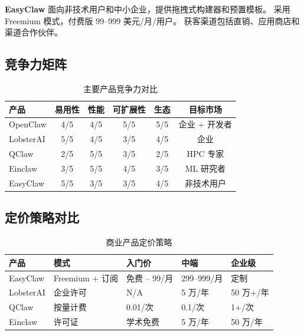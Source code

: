 \documentclass[
  customlatinfont = macos,
]{hkustthesis}
\begin{document}
\textbf{EasyClaw} 面向非技术用户和中小企业，提供拖拽式构建器和预置模板。
采用 Freemium 模式，付费版 99--999 美元/月/用户。
获客渠道包括直销、应用商店和渠道合作伙伴。

\subsection{竞争力矩阵}

\begin{table}[htbp]
\centering
\caption{主要产品竞争力对比}
\label{tab:competition}
\begin{tabular}{@{}lccccc@{}}
\toprule
\textbf{产品} & \textbf{易用性} & \textbf{性能} & \textbf{可扩展性}
              & \textbf{生态} & \textbf{目标市场} \\
\midrule
OpenClaw  & 4/5 & 4/5 & 5/5 & 5/5 & 企业 + 开发者 \\
LobsterAI & 5/5 & 4/5 & 3/5 & 4/5 & 企业          \\
QClaw     & 2/5 & 5/5 & 3/5 & 2/5 & HPC 专家      \\
Einclaw   & 3/5 & 5/5 & 4/5 & 3/5 & ML 研究者     \\
EasyClaw  & 5/5 & 3/5 & 3/5 & 4/5 & 非技术用户    \\
\bottomrule
\end{tabular}
\end{table}

\subsection{定价策略对比}

\begin{table}[htbp]
\centering
\caption{商业产品定价策略}
\label{tab:pricing}
\begin{tabular}{@{}lllll@{}}
\toprule
\textbf{产品} & \textbf{模式} & \textbf{入门价} & \textbf{中端} & \textbf{企业级} \\
\midrule
EasyClaw  & Freemium + 订阅 & 免费 -- 99/月  & 299--999/月 & 定制   \\
LobsterAI & 企业许可        & N/A            & 5 万/年     & 50 万+/年 \\
QClaw     & 按量计费        & 0.01/次        & 0.1/次      & 1+/次  \\
Einclaw   & 许可证          & 学术免费       & 5 万/年     & 50 万/年 \\
\bottomrule
\end{tabular}
\end{table}


\end{document}
